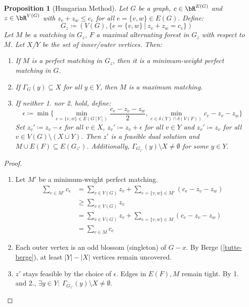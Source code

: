 \documentclass[11pt, a4paper]{article}
\newcommand{\abs}[1]{\left\lvert#1\right\rvert}
\newcommand{\set}[1]{\{#1\}}
\newtheorem{prop}[theorem]{Proposition}
\theoremstyle{remark}
\theoremstyle{definition}
\begin{document}
\begin{prop}[Hungarian Method]
	Let $G$ be a graph, $c\in\bR^{E(G)}$ and $z\in\bR^{V(G)}$ with
	$z_v+z_w\leq c_e$ for all $e=\set{v,w}\in E(G)$. Define:
	\[G_z\coloneqq (V(G), \set{e=\set{v,w}\ |\ z_v+z_w=c_e})\]
	Let $M$ be a matching in $G_z$, $F$ a maximal alternating forest in
	$G_z$ with respect to $M$. Let $X$/$Y$ be the set of inner/outer
	vertices. Then:
	\begin{enumerate}
		\item If $M$ is a perfect matching in $G_z$, then it is a minimum-weight
		perfect matching in $G$.
		\item If $\Gamma_G(y)\subseteq X$ for all $y\in Y$, then $M$ is a maximum
		matching.
		\item If neither 1. nor 2. hold, define:
		\[
			\epsilon\coloneqq\min\set{
				\min_{e=\set{v,w}\in E(G[Y])}\frac{c_e-z_v-z_w}{2},
				\min_{e\in \delta(Y)\cap \delta(V(F))}c_e-z_v-z_w}
		\]
		Set $z_v'\coloneqq z_v-\epsilon$ for all $v\in X$, $z_v'\coloneqq
			z_v+\epsilon$ for all $v\in Y$ and $z_v'\coloneqq z_v$ for all $v\in
			V(G)\setminus(X\cup Y)$. Then $z'$ is a feasible dual solution and
		$M\cup E(F)\subseteq E(G_{z'})$. Additionally,
		$\Gamma_{G_{z'}}(y)\setminus X\neq\emptyset$ for some $y\in Y$.
	\end{enumerate}
\end{prop}
\begin{proof}
	\begin{enumerate}
		\item
		Let $M'$ be a minimum-weight perfect matching.
		\begin{align*}
			\sum_{e\in M'}c_e & =\sum_{v\in V(G)}z_v+\sum_{e=\set{v,w}\in M'}(c_e-z_v-z_w) \\
			                  & \geq \sum_{v\in V(G)}z_v                                   \\
			                  & =\sum_{v\in V(G)}z_v+\sum_{e=\set{v,w}\in M}(c_e-z_v-z_w)  \\
			                  & =\sum_{e\in M}c_e
		\end{align*}

		\item
		Each outer vertex is an odd blossom (singleton) of $G-x$. By Berge
		(\ref{tutte-berge}), at least $\abs{Y}-\abs{X}$ vertices remain uncovered.

		\item
		$z'$ stays feasible by the choice of $\epsilon$. Edges in $E(F),M$ remain
		tight. By 1. and 2., $\exists y\in Y:\ \Gamma_{G_{z'}}(y)\setminus X\neq\emptyset$.

	\end{enumerate}
\end{proof}
\end{document}
